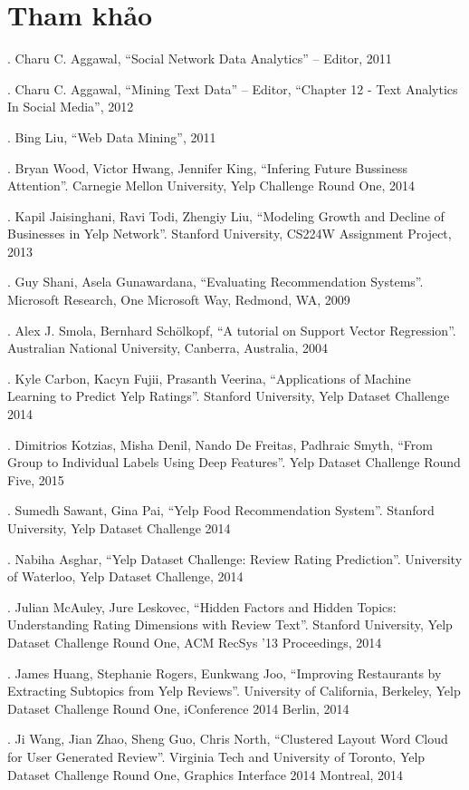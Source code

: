 \documentclass[12pt]{extarticle}
\begin{document}
	\section {Tham khảo}
		\par [1].	Charu C. Aggawal, “Social Network Data Analytics” – Editor, 2011
		\par [2].	Charu C. Aggawal, “Mining Text Data” – Editor, “Chapter 12 - Text Analytics In Social Media”, 2012
		\par [3].	Bing Liu, “Web Data Mining”, 2011
		\par [4].	Bryan Wood, Victor Hwang, Jennifer King, “Infering Future Bussiness Attention”. Carnegie Mellon University, Yelp Challenge Round One, 2014
		\par [5].	Kapil Jaisinghani, Ravi Todi, Zhengiy Liu, “Modeling Growth and Decline of Businesses in Yelp Network”. Stanford University, CS224W Assignment Project, 2013
		\par [6].	Guy Shani, Asela Gunawardana, “Evaluating Recommendation Systems”. Microsoft Research, One Microsoft Way, Redmond, WA, 2009
		\par [7].	Alex J. Smola, Bernhard Schölkopf, “A tutorial on Support Vector Regression”. Australian National University, Canberra, Australia, 2004
		\par [8].	Kyle Carbon, Kacyn Fujii, Prasanth Veerina, “Applications of Machine Learning to Predict Yelp Ratings”. Stanford University, Yelp Dataset Challenge 2014
		\par [9].	Dimitrios Kotzias, Misha Denil, Nando De Freitas, Padhraic Smyth, “From Group to Individual Labels Using Deep Features”. Yelp Dataset Challenge Round Five, 2015
		\par [10].	Sumedh Sawant, Gina Pai, “Yelp Food Recommendation System”. Stanford University, Yelp Dataset Challenge 2014
		\par [11].	Nabiha Asghar, “Yelp Dataset Challenge: Review Rating Prediction”. University of Waterloo, Yelp Dataset Challenge, 2014
		\par [12].	Julian McAuley, Jure Leskovec, “Hidden Factors and Hidden Topics: Understanding Rating Dimensions with Review Text”. Stanford University, Yelp Dataset Challenge Round One, ACM RecSys '13 Proceedings, 2014
		\par [13].	James Huang, Stephanie Rogers, Eunkwang Joo, “Improving Restaurants by Extracting Subtopics from Yelp Reviews”. University of California, Berkeley, Yelp Dataset Challenge Round One, iConference 2014 Berlin, 2014
		\par [14].	Ji Wang, Jian Zhao, Sheng Guo, Chris North, “Clustered Layout Word Cloud for User Generated Review”. Virginia Tech and University of Toronto, Yelp Dataset Challenge Round One, Graphics Interface 2014 Montreal, 2014
\end{document}
